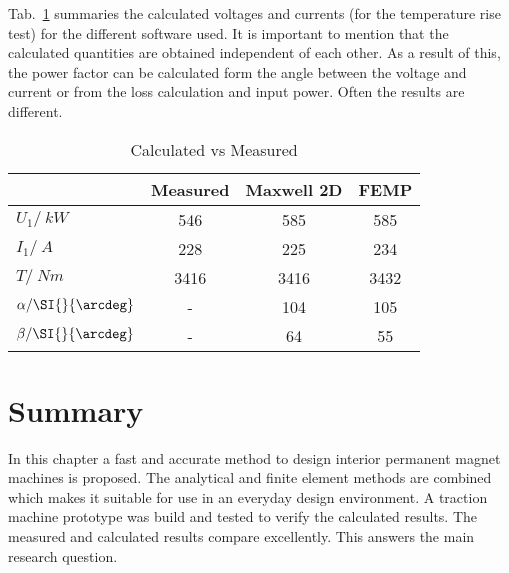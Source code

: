 Tab.~\ref{tab:CalculatedVsMeasured} summaries the calculated voltages and currents (for the temperature rise test) for the different software used. It is important to mention that the calculated quantities are obtained independent of each other. As a result of this, the power factor can be calculated form the angle between the voltage and current or from the loss calculation and input power. Often the results are different.
\begin{table}
  \centering
  \caption{Calculated vs Measured}
  \begin{tabular}{lccc}
    \toprule
      &  Measured & Maxwell 2D  & FEMP \\\hline
     $U_1/\SI{}{kW}$   & 546   & 585  & 585  \\
     $I_1/\SI{}{A}$    & 228   & 225  & 234  \\
     $T/\SI{}{Nm}$     & 3416  & 3416 & 3432 \\
     $\alpha/\SI{}{\arcdeg}$ & -     & 104  & 105  \\
     $\beta/\SI{}{\arcdeg}$  & -     & 64   & 55   \\
     \bottomrule  
  \end{tabular}
  \label{tab:CalculatedVsMeasured}
\end{table}

\section{Summary}
In this chapter a fast and accurate method to design interior permanent magnet machines is proposed. The analytical and finite element methods are combined which makes it suitable for use in an everyday design environment. A traction machine prototype was build and tested to verify the calculated results. The measured and calculated results compare excellently. This answers the main research question. 

\endinput